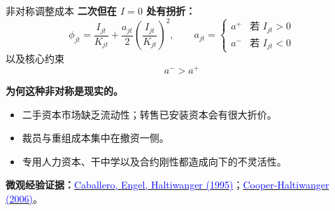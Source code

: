 \documentclass{beamer}
\begin{document}
\begin{frame}{非对称调整成本}
    \textbf{二次但在 $I=0$ 处有拐折：}
    \begin{equation}\label{equ:zhang cost}
        \phi_{jt} = \frac{I_{jt}}{K_{jt}} + \frac{a_{jt}}{2}\left(\frac{I_{jt}}{K_{jt}}\right)^2,
        \qquad a_{jt} = \begin{cases} a^+ & \text{若 } I_{jt} > 0 \\ a^- & \text{若 } I_{jt} < 0 \end{cases}
    \end{equation}
    以及核心约束
    \begin{equation*}
        \boxed{a^- > a^+}
    \end{equation*}

    \vspace{0.1cm}
    \textbf{为何这种非对称是现实的。}
    \begin{itemize}
        \item 二手资本市场缺乏流动性；转售已安装资本会有很大折价。
        \item 裁员与重组成本集中在撤资一侧。
        \item 专用人力资本、干中学以及合约刚性都造成向下的不灵活性。
    \end{itemize}

    \vspace{0.1cm}
    \textbf{微观经验证据：}\href{https://doi.org/10.1086/250002}{\textcolor{blue}{Caballero, Engel, Haltiwanger (1995)}}；\href{https://www.jstor.org/stable/2233834}{\textcolor{blue}{Cooper-Haltiwanger (2006)}}。
\end{frame}
\end{document}
